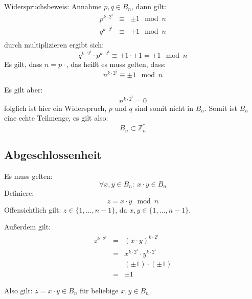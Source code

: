 \documentclass[DIN, pagenumber=false, fontsize=11pt, parskip=half]{scrartcl}
\begin{document}
    Widerspruchsbeweis: Annahme $p, q \in B_n$, dann gilt:
    \begin{eqnarray}
        p^{k \cdot 2^i} &\equiv& \pm 1 \mod n \\
        q^{k \cdot 2^i} &\equiv& \pm 1 \mod n \\
    \end{eqnarray}
    durch multiplizieren ergibt sich:
    \begin{equation}
        q^{k \cdot 2^i} \cdot p^{k \cdot 2^i} \equiv \pm 1 \cdot \pm 1 = \pm 1 \mod n
    \end{equation}
    Es gilt, dass $n=p\cdot$, das heißt es muss gelten, dass:
    \begin{equation}
        n^{k \cdot 2^i} \equiv \pm 1 \mod n
    \end{equation} 

    Es gilt aber:
    \begin{equation}
        n^{k \cdot 2^i} = 0
    \end{equation}
    folglich ist hier ein Widerspruch, $p$ und $q$ sind somit nicht in $B_n$.
    Somit ist $B_n$ eine echte Teilmenge, es gilt also:
    \begin{equation}
        B_n \subset \mathbb{Z}^*_n
    \end{equation}

    \subsection{Abgeschlossenheit}
    Es muss gelten:
    \begin{equation}
        \forall x, y \in B_n:\ x \cdot y \in B_n
    \end{equation}
    Definiere:
    \begin{equation}
        z = x \cdot y \mod n
    \end{equation}
    Offensichtlich gilt: $z \in \{1, \ldots, n-1\}$, da $x, y \in \{1, \ldots, n-1\}$.

    Außerdem gilt:
    \begin{eqnarray}
        z^{k \cdot 2^i} &=& {\left(x \cdot y\right)}^{k \cdot 2^i} \\
            &=& x^{k \cdot 2^i} \cdot y^{k \cdot 2^i} \\
            &=& (\pm 1) \cdot (\pm 1) \\
            &=& \pm 1
    \end{eqnarray}

    Also gilt: $z = x \cdot y \in B_n$ für beliebige $x, y \in B_n$.
\end{document}
